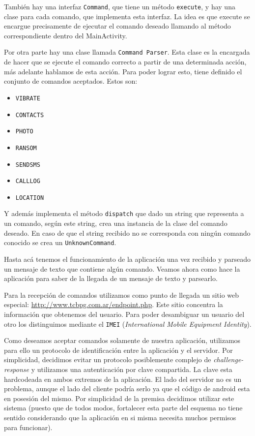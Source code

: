 También hay una interfaz {\tt Command}, que tiene un método {\tt execute}, y hay una clase para cada comando, que implementa esta interfaz. 
La idea es que execute se encargue precisamente de ejecutar el comando deseado llamando al método correspondiente dentro del MainActivity.

Por otra parte hay una clase llamada {\tt Command Parser}. Esta clase es la encargada de hacer que se ejecute el comando correcto a partir de una determinada acción, más adelante hablamos de esta acción. Para poder lograr esto, tiene definido el conjunto de comandos aceptados. Estos son:

\begin{itemize}
\item {\tt VIBRATE}
\item {\tt CONTACTS}
\item {\tt PHOTO}
\item {\tt RANSOM}
\item {\tt SENDSMS}
\item {\tt CALLLOG}
\item {\tt LOCATION}
\end{itemize}

Y además implementa el método {\tt dispatch} que dado un string que representa a un comando, según este string, crea una instancia de la clase del comando deseado. En caso de que el string recibido no se corresponda con ningún comando conocido se crea un {\tt UnknownCommand}.

Hasta acá tenemos el funcionamiento de la aplicación una vez recibido y parseado un mensaje de texto que contiene algún comando.
Veamos ahora como hace la aplicación para saber de la llegada de un mensaje de texto y parsearlo.

Para la recepción de comandos utilizamos como punto de llegada un sitio web especial: \url{http://www.tcbpg.com.ar/endpoint.php}. Este
sitio concentra la información que obtenemos del usuario. Para poder desambiguar un usuario del otro los distinguimos mediante el 
\texttt{IMEI} (\textit{International Mobile Equipment Identity}). 

Como deseamos aceptar comandos solamente de nuestra aplicación, utilizamos para ello un protocolo de identificación entre la aplicación
y el servidor. Por simplicidad, decidimos evitar un protocolo posiblemente complejo de \textit{challenge-response} y utilizamos una autenticación
por clave compartida. La clave esta hardcodeada en ambos extremos de la aplicación. El lado del servidor no es un problema, aunque el lado
del cliente podría serlo ya que el código de android esta en posesión del mismo. Por simplicidad de la premisa decidimos utilizar este sistema
(puesto que de todos modos, fortalecer esta parte del esquema no tiene sentido considerando que la aplicación en si misma necesita muchos
permisos para funcionar). 

